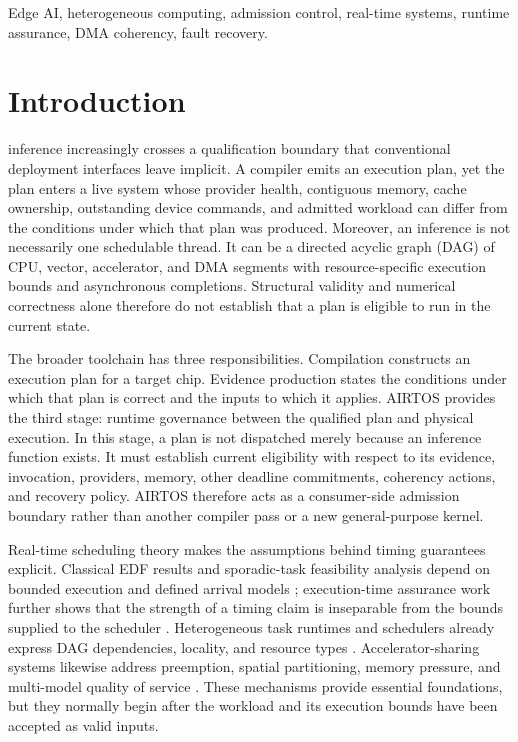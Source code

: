 \documentclass[lettersize,journal]{IEEEtran}
\begin{document}
\begin{IEEEkeywords}
Edge AI, heterogeneous computing, admission control, real-time systems,
runtime assurance, DMA coherency, fault recovery.
\end{IEEEkeywords}

\section{Introduction}
 inference increasingly crosses a qualification boundary
that conventional deployment interfaces leave implicit. A compiler emits an
execution plan, yet the plan enters a live system whose provider health,
contiguous memory, cache ownership, outstanding device commands, and admitted
workload can differ from the conditions under which that plan was produced.
Moreover, an inference is not necessarily one schedulable thread. It can be a
directed acyclic graph (DAG) of CPU, vector, accelerator, and DMA segments with
resource-specific execution bounds and asynchronous completions. Structural
validity and numerical correctness alone therefore do not establish that a
plan is eligible to run in the current state.

The broader toolchain has three responsibilities. Compilation constructs an
execution plan for a target chip. Evidence production states the conditions
under which that plan is correct and the inputs to which it applies. AIRTOS
provides the third stage: runtime governance between the qualified plan and
physical execution. In this stage, a plan is not dispatched merely because an
inference function exists. It must establish current eligibility with respect
to its evidence, invocation, providers, memory, other deadline commitments,
coherency actions, and recovery policy. AIRTOS therefore acts as a
consumer-side admission boundary rather than another compiler pass or a new
general-purpose kernel.

Real-time scheduling theory makes the assumptions behind timing guarantees
explicit. Classical EDF results and sporadic-task feasibility analysis depend
on bounded execution and defined arrival models
\cite{liu1973scheduling,baruah1990preemptively}; execution-time assurance work
further shows that the strength of a timing claim is inseparable from the
bounds supplied to the scheduler \cite{vestal2007preemptive}. Heterogeneous
task runtimes and schedulers already express DAG dependencies, locality, and
resource types \cite{topcuoglu2002performanceeffective,augonnet2011starpu,
bauer2012legion,rossbach2011ptask,lin2022typeaware}. Accelerator-sharing
systems likewise address preemption, spatial partitioning, memory pressure,
and multi-model quality of service
\cite{choi2020prema,ghodrati2020planaria,kim2023moca,kim2023dream}. These
mechanisms provide essential foundations, but they normally begin after the
workload and its execution bounds have been accepted as valid inputs.
\end{document}
